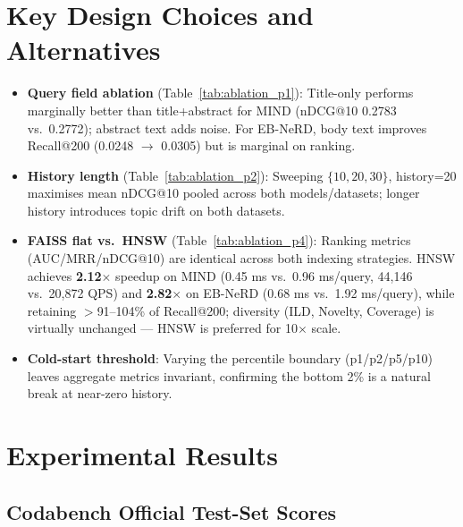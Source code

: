 \documentclass[11pt,a4paper]{article}
\begin{document}
\section{Key Design Choices and Alternatives}

\begin{itemize}
  \item \textbf{Query field ablation} (Table~\ref{tab:ablation_p1}): Title-only performs marginally better than title+abstract for MIND (nDCG@10 0.2783 vs.\ 0.2772); abstract text adds noise.  For EB-NeRD, body text improves Recall@200 (0.0248 $\to$ 0.0305) but is marginal on ranking.
  \item \textbf{History length} (Table~\ref{tab:ablation_p2}): Sweeping $\{10,20,30\}$, history=20 maximises mean nDCG@10 pooled across both models/datasets; longer history introduces topic drift on both datasets.
  \item \textbf{FAISS flat vs.\ HNSW} (Table~\ref{tab:ablation_p4}): Ranking metrics (AUC/MRR/nDCG@10) are identical across both indexing strategies. HNSW achieves \textbf{2.12$\times$} speedup on MIND (0.45 ms vs.\ 0.96 ms/query, 44{,}146 vs.\ 20{,}872 QPS) and \textbf{2.82$\times$} on EB-NeRD (0.68 ms vs.\ 1.92 ms/query), while retaining $>$91--104\% of Recall@200; diversity (ILD, Novelty, Coverage) is virtually unchanged --- HNSW is preferred for 10$\times$ scale.
  \item \textbf{Cold-start threshold}: Varying the percentile boundary (p1/p2/p5/p10) leaves aggregate metrics invariant, confirming the bottom 2\% is a natural break at near-zero history.
\end{itemize}

\section{Experimental Results}

\subsection{Codabench Official Test-Set Scores}
\end{document}
